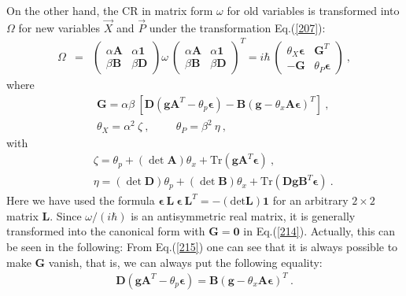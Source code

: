 \documentclass[a4paper,seceq]{ptptex}
\newcommand{\bfg}{ \boldsymbol{g} }
\newcommand{\bfA}{ \boldsymbol{A} }
\newcommand{\bfB}{ \boldsymbol{B} }
\newcommand{\bfD}{ \boldsymbol{D} }
\newcommand{\bfG}{ \boldsymbol{G} }
\newcommand{\bfL}{ \boldsymbol{L} }
\newcommand{\bfeps}{\boldsymbol{\epsilon}}
\newcommand{\vecP}{ {\vec P} }
\newcommand{\vecX}{ {\vec X} }
\newcommand{\Tr}{\mbox{Tr}}
\begin{document}
On the other hand, the CR in matrix form $\omega$ for old variables
is transformed into $\Omega$ for new variables $\vecX$ and $\vecP$
under the transformation Eq.(\ref{207}):
\begin{eqnarray}
 \Omega &=&
     \begin{pmatrix}
        \alpha \bfA & \alpha \boldsymbol{1} \\
         \beta \bfB & \beta \bfD     \end{pmatrix} \omega~
     \begin{pmatrix}
        \alpha \bfA & \alpha \boldsymbol{1} \\
         \beta \bfB & \beta \bfD \end{pmatrix}^T
  = i \hbar~\begin{pmatrix}
               \theta_X \bfeps & \bfG^T \\
                        - \bfG & \theta_P \bfeps \end{pmatrix}~,
\label{214}
\end{eqnarray}
where
\begin{eqnarray}
 & & \bfG = \alpha \beta~\left[
       \bfD \left( \bfg \bfA^T - \theta_p \bfeps \right)
     - \bfB \left( \bfg - \theta_x \bfA \bfeps \right)^T \right]~,
\label{215} \\
 & & \theta_X = \alpha^2~\zeta~, \hspace{1cm} \theta_P = \beta^2~\eta~,
\label{216}
\end{eqnarray}
with
\begin{eqnarray}
 & & \zeta = \theta_p + (\det\bfA) \theta_x
      + \Tr\left( \bfg \bfA^T \bfeps \right)~,
\label{217} \\
 & & \eta =  (\det\bfD) \theta_p + (\det\bfB) \theta_x
      + \Tr\left( \bfD \bfg \bfB^T \bfeps \right)~.
\label{218}
\end{eqnarray}
Here we have used the formula $\displaystyle{
\bfeps~\bfL~\bfeps~ \bfL^T = - ( \mbox{det} \bfL ) \boldsymbol{1} }$
for an arbitrary $2\times 2$ matrix  $\bfL$.
Since $\omega /(i\hbar )$ is an antisymmetric real matrix,
it is generally transformed into the canonical form with
$\bfG= \boldsymbol{0}$ in Eq.(\ref{214}).
Actually, this can be seen in the following:
From Eq.(\ref{215}) one can see that it is always possible
to make $\bfG$ vanish, that is,
we can always put the following equality:
\begin{eqnarray}
   \bfD \left( \bfg \bfA^T - \theta_p \bfeps \right)
   =\bfB \left( \bfg - \theta_x \bfA \bfeps \right)^T~.
\label{219}
\end{eqnarray}
\end{document}
